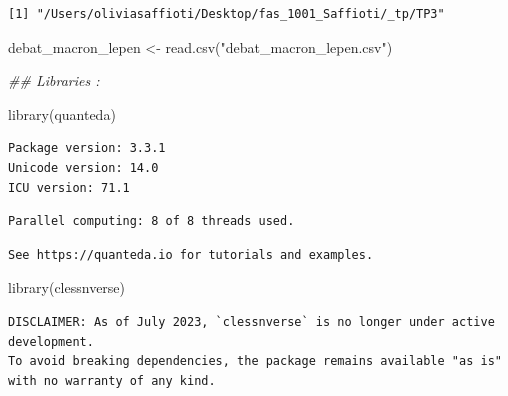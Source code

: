 \documentclass[
  letterpaper,
  DIV=11,
  numbers=noendperiod]{scrartcl}
\newenvironment{Shaded}{\begin{snugshade}}{\end{snugshade}}
\newcommand{\DocumentationTok}[1]{\textcolor[rgb]{0.37,0.37,0.37}{\textit{#1}}}
\newcommand{\FunctionTok}[1]{\textcolor[rgb]{0.28,0.35,0.67}{#1}}
\newcommand{\NormalTok}[1]{\textcolor[rgb]{0.00,0.23,0.31}{#1}}
\newcommand{\OtherTok}[1]{\textcolor[rgb]{0.00,0.23,0.31}{#1}}
\newcommand{\StringTok}[1]{\textcolor[rgb]{0.13,0.47,0.30}{#1}}
\begin{document}
\begin{verbatim}
[1] "/Users/oliviasaffioti/Desktop/fas_1001_Saffioti/_tp/TP3"
\end{verbatim}

\begin{Shaded}
\begin{Highlighting}[]
\NormalTok{debat\_macron\_lepen }\OtherTok{\textless{}{-}} \FunctionTok{read.csv}\NormalTok{(}\StringTok{"debat\_macron\_lepen.csv"}\NormalTok{)}

\DocumentationTok{\#\# Libraries :}

\FunctionTok{library}\NormalTok{(quanteda)}
\end{Highlighting}
\end{Shaded}

\begin{verbatim}
Package version: 3.3.1
Unicode version: 14.0
ICU version: 71.1
\end{verbatim}

\begin{verbatim}
Parallel computing: 8 of 8 threads used.
\end{verbatim}

\begin{verbatim}
See https://quanteda.io for tutorials and examples.
\end{verbatim}

\begin{Shaded}
\begin{Highlighting}[]
\FunctionTok{library}\NormalTok{(clessnverse)}
\end{Highlighting}
\end{Shaded}

\begin{verbatim}
DISCLAIMER: As of July 2023, `clessnverse` is no longer under active development.
To avoid breaking dependencies, the package remains available "as is" with no warranty of any kind.
\end{verbatim}
\end{document}
